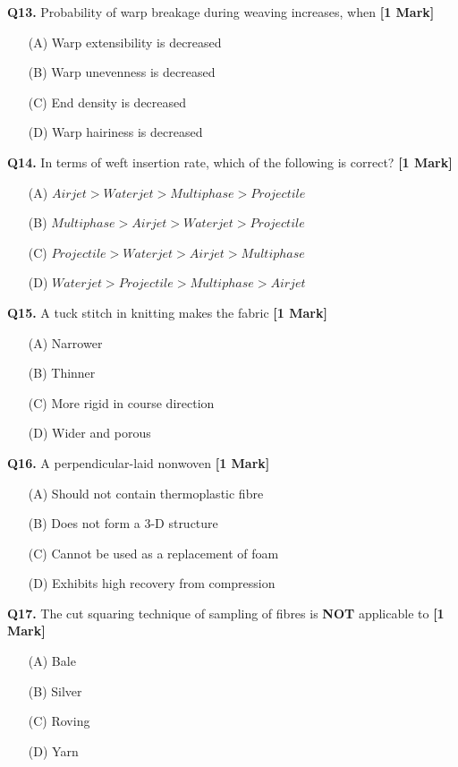 \documentclass[11pt]{article}
\newcommand{\questiona}[2]{
    \noindent\textbf{Q#2.} #1 \hfill \textbf{[1 Mark]}
}
\begin{document}
\questiona{Probability of warp breakage during weaving increases, when}{13}
\begin{enumerate}
    \item[(A)] Warp extensibility is decreased  
    \item[(B)] Warp unevenness is decreased  
    \item[(C)] End density is decreased  
    \item[(D)] Warp hairiness is decreased  
\end{enumerate}
\vspace{0.5cm}

\questiona{In terms of weft insertion rate, which of the following is correct?}{14}
\begin{enumerate}
    \item[(A)] $Airjet > Waterjet > Multiphase > Projectile$  
    \item[(B)] $Multiphase > Airjet > Waterjet > Projectile$  
    \item[(C)] $Projectile > Waterjet > Airjet > Multiphase$  
    \item[(D)] $Waterjet > Projectile > Multiphase > Airjet$  
\end{enumerate}
\vspace{0.5cm}

\questiona{A tuck stitch in knitting makes the fabric}{15}
\begin{enumerate}
    \item[(A)] Narrower  
    \item[(B)] Thinner  
    \item[(C)] More rigid in course direction  
    \item[(D)] Wider and porous  
\end{enumerate}
\vspace{0.5cm}

\questiona{A perpendicular-laid nonwoven}{16}
\begin{enumerate}
    \item[(A)] Should not contain thermoplastic fibre  
    \item[(B)] Does not form a 3-D structure  
    \item[(C)] Cannot be used as a replacement of foam  
    \item[(D)] Exhibits high recovery from compression  
\end{enumerate}
\vspace{0.5cm}

\questiona{The cut squaring technique of sampling of fibres is \textbf{NOT} applicable to}{17}
\begin{enumerate}
    \item[(A)] Bale  
    \item[(B)] Silver  
    \item[(C)] Roving  
    \item[(D)] Yarn  
\end{enumerate}
\vspace{0.5cm}
\end{document}
